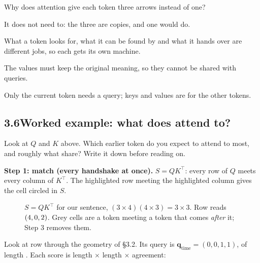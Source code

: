 \begin{checkq}
Why does attention give each token three arrows instead of one?
\begin{options}
\item It does not need to: the three are copies, and one would do.
\item What a token looks for, what it can be found by and what it hands over are different jobs, so each gets its own machine.
\item The values must keep the original meaning, so they cannot be shared with queries.
\item Only the current token needs a query; keys and values are for the other tokens.
\end{options}
\end{checkq}


\subsection*{3.6\quad Worked example: what does  attend to?}

\Predict Look at $Q$ and $K$ above. Which earlier token do you expect  to attend to most, and roughly
what share? Write it down before reading on.

\textbf{Step 1: match (every handshake at once).} $S = QK^\top$: every row of $Q$ meets every column of $K^\top$.
The highlighted row  meeting the highlighted column  gives the cell circled in $S$.

\begin{figure}[!htb]
\centering

\caption{$S=QK^\top$ for our sentence, $(3\times4)(4\times3)=3\times3$. Row  reads $(4, 0,
2)$. Grey cells are a token meeting a token that comes \emph{after} it; Step 3 removes them.}
\end{figure}

Look at row  through the geometry of \S3.2. Its query is $\bm{q}_{\text{time}}=(0,0,1,1)$, of length
\lenQ. Each score is length $\times$ length $\times$ agreement:

